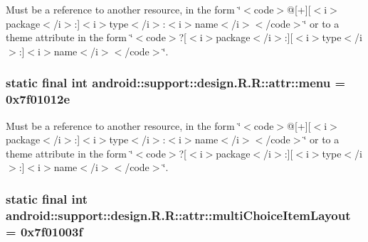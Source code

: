 Must be a reference to another resource, in the form \char`\"{}$<$code$>$@\mbox{[}+\mbox{]}\mbox{[}$<$i$>$package$<$/i$>$:\mbox{]}$<$i$>$type$<$/i$>$:$<$i$>$name$<$/i$>$$<$/code$>$\char`\"{} or to a theme attribute in the form \char`\"{}$<$code$>$?\mbox{[}$<$i$>$package$<$/i$>$:\mbox{]}\mbox{[}$<$i$>$type$<$/i$>$:\mbox{]}$<$i$>$name$<$/i$>$$<$/code$>$\char`\"{}. \hypertarget{classandroid_1_1support_1_1design_1_1_r_1_1attr_474947f8669938bc4ed60924bc39f780}{
\subsubsection[{menu}]{\setlength{\rightskip}{0pt plus 5cm}static final int android::support::design.R.R::attr::menu = 0x7f01012e}}
\label{classandroid_1_1support_1_1design_1_1_r_1_1attr_474947f8669938bc4ed60924bc39f780}


Must be a reference to another resource, in the form \char`\"{}$<$code$>$@\mbox{[}+\mbox{]}\mbox{[}$<$i$>$package$<$/i$>$:\mbox{]}$<$i$>$type$<$/i$>$:$<$i$>$name$<$/i$>$$<$/code$>$\char`\"{} or to a theme attribute in the form \char`\"{}$<$code$>$?\mbox{[}$<$i$>$package$<$/i$>$:\mbox{]}\mbox{[}$<$i$>$type$<$/i$>$:\mbox{]}$<$i$>$name$<$/i$>$$<$/code$>$\char`\"{}. \hypertarget{classandroid_1_1support_1_1design_1_1_r_1_1attr_9463490613c2a49b518f93ca0397da1d}{
\subsubsection[{multiChoiceItemLayout}]{\setlength{\rightskip}{0pt plus 5cm}static final int android::support::design.R.R::attr::multiChoiceItemLayout = 0x7f01003f}}
\label{classandroid_1_1support_1_1design_1_1_r_1_1attr_9463490613c2a49b518f93ca0397da1d}


